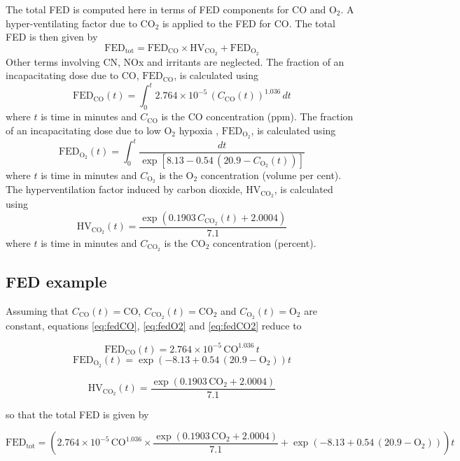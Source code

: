 \documentclass[11pt,twoside]{book}
\newcommand{\be}{\begin{equation}}
\newcommand{\ee}{\end{equation}}
\begin{document}
The total FED is computed here in terms of FED components for CO and $\mathrm{O_2}$.  A hyper-ventilating factor due to
$\mathrm{CO_2}$ is applied to
the FED for CO. The total FED is then given by
\be
\mathrm{FED}_\mathrm{tot} = \mathrm{FED}_\mathrm{CO} \times \mathrm{HV}_\mathrm{CO_2} + \mathrm{FED}_\mathrm{O_2}
\ee
Other terms involving CN, NOx and irritants are neglected.
The fraction of an incapacitating dose due to CO, $\mathrm{FED}_\mathrm{CO}$, is calculated using
\be
\mathrm{FED}_\mathrm{CO}(t) = \int_0^t 2.764 \times 10^{-5} \, (C_\mathrm{CO}(t))^{1.036} \, dt
\label{eq:fedCO}
\ee
where $t$ is time in minutes and $C_\mathrm{CO}$ is the CO concentration (ppm).
The fraction of an incapacitating dose due to low O${}_2$ hypoxia , $\mathrm{FED}_\mathrm{O_2}$, is calculated using
\be
\mathrm{FED}_\mathrm{O_2}(t) =  \int_0^t \frac{dt}{\exp \left [ 8.13 - 0.54 \, (20.9 - C_\mathrm{O_2}(t)) \right ] }
\label{eq:fedO2}
\ee
where $t$ is time in minutes and $C_\mathrm{O_2}$ is the O${}_2$ concentration (volume per cent).
The hyperventilation factor induced by carbon dioxide, $\mathrm{HV}_\mathrm{CO_2}$, is calculated using
\be
\mathrm{HV}_\mathrm{CO_2}(t) = \frac{ \exp( 0.1903 \, C_\mathrm{CO_2}(t) +  2.0004 ) }{7.1} \label{co2hyp}
\label{eq:fedCO2}
\ee
where $t$ is time in minutes and $C_\mathrm{CO_2}$ is the $\mathrm{CO_2}$ concentration (percent).

\subsection{FED example}
Assuming that $C_\mathrm{CO}(t)=\mathrm{CO}$, $C_\mathrm{CO_2}(t)=\mathrm{CO_2}$ and $C_\mathrm{O_2}(t)=\mathrm{O_2}$ are constant,
equations \ref{eq:fedCO}, \ref{eq:fedO2} and \ref{eq:fedCO2} reduce to

\be
\mathrm{FED}_\mathrm{CO}(t) = 2.764 \times 10^{-5} \, \mathrm{CO}^{1.036} \, t
\label{eq:fedCOcons}
\ee
\be
\mathrm{FED}_\mathrm{O_2}(t) =   \exp( -8.13 + 0.54 \, (20.9 - \mathrm{O_2}) )t
\label{eq:fedO2cons}
\ee

\be
\mathrm{HV}_\mathrm{CO_2}(t) = \frac{ \exp( 0.1903 \, \mathrm{CO_2} +  2.0004 ) }{7.1}
\label{eq:fedCO2cons}
\ee

so that the total FED is given by

\be
\mathrm{FED}_\mathrm{tot} = \left(2.764 \times 10^{-5} \, \mathrm{CO}^{1.036}
\times
\frac{ \exp( 0.1903 \, \mathrm{CO_2} +  2.0004 ) }{7.1}
+
   \exp( -8.13 + 0.54 \, (20.9 - \mathrm{O_2}) )
   \right) t
   \ee

\end{document}
